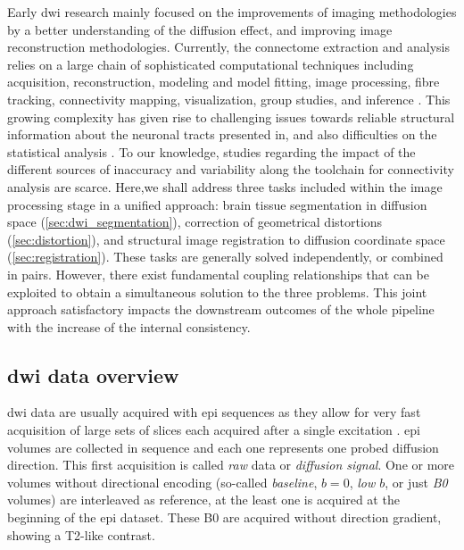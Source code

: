 Early \gls{dwi} research mainly focused on the improvements of imaging 
methodologies by a better understanding of the diffusion effect, and improving
image reconstruction methodologies. Currently, the connectome extraction 
and analysis relies on a large chain of sophisticated computational techniques
including acquisition, reconstruction, modeling and model fitting, image processing, 
fibre tracking, connectivity mapping, visualization, group studies, and inference
\citep{daducci_connectome_2012}. This growing complexity has given rise to 
challenging issues towards reliable structural information about the neuronal tracts 
presented in, and also difficulties on the statistical analysis 
\citep{bullmore_complex_2009,meskaldji_comparing_2013}. To our knowledge, studies 
regarding the impact of the different sources of inaccuracy and variability along
the toolchain for connectivity analysis \citep{jones_twenty-five_2010,
cheng_characteristics_2012,jones_white_2013} are scarce.
Here,we shall address three tasks included within  the image processing stage in 
a unified approach: brain tissue segmentation in diffusion space 
(\autoref{sec:dwi_segmentation}), 
correction of geometrical distortions (\autoref{sec:distortion}), and structural 
image registration to diffusion coordinate space (\autoref{sec:registration}). 
These tasks are generally
solved independently, or combined in pairs. However, there exist fundamental 
coupling relationships that can be exploited to obtain a simultaneous solution to 
the three problems. This joint approach satisfactory impacts the downstream
outcomes of the whole pipeline with the increase of the internal consistency.

\subsection{\Gls{dwi} data overview}
\label{sec:dwi_overview}
\gls{dwi} data are usually acquired with \gls{epi} sequences 
as they allow for very fast acquisition of large sets of slices each
acquired after a single excitation \citep{mukherjee_diffusion_2008,
soares_hitchhikers_2013}. \Gls{epi} volumes are collected
in sequence and each one represents one probed diffusion direction.
This first acquisition is called \emph{raw} data or \emph{diffusion
signal}. One or more volumes without directional encoding (so-called \emph{baseline},
$b = 0$, \emph{low $b$}, or just \emph{B0} volumes) are interleaved as
reference, at the least one is acquired at the beginning of the
\gls{epi} dataset. These B0 are acquired without direction gradient,
showing a T2-like contrast.

